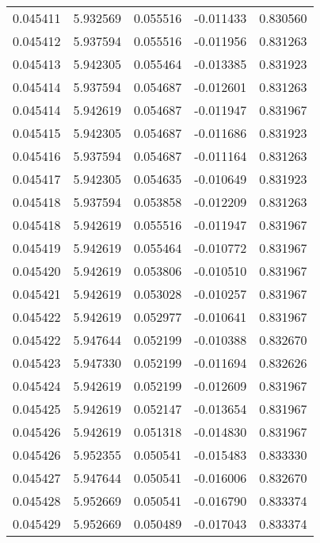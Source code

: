 \begin{tabular}{lrrrr}
0.045411    &  5.932569 &  0.055516 & -0.011433 &             0.830560 \\
0.045412    &  5.937594 &  0.055516 & -0.011956 &             0.831263 \\
0.045413    &  5.942305 &  0.055464 & -0.013385 &             0.831923 \\
0.045414    &  5.937594 &  0.054687 & -0.012601 &             0.831263 \\
0.045414    &  5.942619 &  0.054687 & -0.011947 &             0.831967 \\
0.045415    &  5.942305 &  0.054687 & -0.011686 &             0.831923 \\
0.045416    &  5.937594 &  0.054687 & -0.011164 &             0.831263 \\
0.045417    &  5.942305 &  0.054635 & -0.010649 &             0.831923 \\
0.045418    &  5.937594 &  0.053858 & -0.012209 &             0.831263 \\
0.045418    &  5.942619 &  0.055516 & -0.011947 &             0.831967 \\
0.045419    &  5.942619 &  0.055464 & -0.010772 &             0.831967 \\
0.045420    &  5.942619 &  0.053806 & -0.010510 &             0.831967 \\
0.045421    &  5.942619 &  0.053028 & -0.010257 &             0.831967 \\
0.045422    &  5.942619 &  0.052977 & -0.010641 &             0.831967 \\
0.045422    &  5.947644 &  0.052199 & -0.010388 &             0.832670 \\
0.045423    &  5.947330 &  0.052199 & -0.011694 &             0.832626 \\
0.045424    &  5.942619 &  0.052199 & -0.012609 &             0.831967 \\
0.045425    &  5.942619 &  0.052147 & -0.013654 &             0.831967 \\
0.045426    &  5.942619 &  0.051318 & -0.014830 &             0.831967 \\
0.045426    &  5.952355 &  0.050541 & -0.015483 &             0.833330 \\
0.045427    &  5.947644 &  0.050541 & -0.016006 &             0.832670 \\
0.045428    &  5.952669 &  0.050541 & -0.016790 &             0.833374 \\
0.045429    &  5.952669 &  0.050489 & -0.017043 &             0.833374 \\

\end{tabular}
